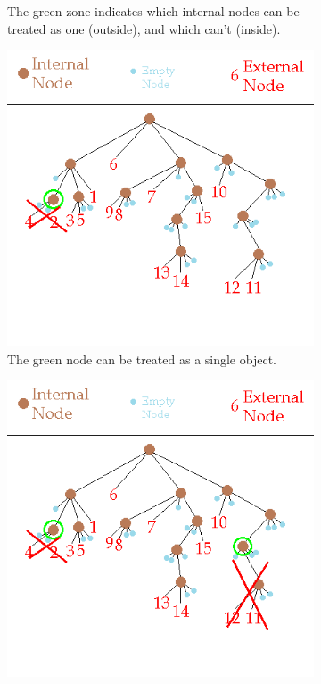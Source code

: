 \begin{figure}[ht]
\begin{subfigure}{0.24\textwidth}
\caption{The green zone indicates which internal nodes can be treated as one (outside), and which can't (inside).}
\end{subfigure}\hspace{1cm}
\begin{subfigure}{0.24\textwidth}
\includegraphics[width=\textwidth]{barneshut_tree_node_4_2.png}
\caption{The green node can be treated as a single object.}
\end{subfigure}\hspace{1cm}
\begin{subfigure}{0.24\textwidth}
\includegraphics[width=\textwidth]{barneshut_tree_node_lvl3.png}

\end{subfigure}
\end{figure}
